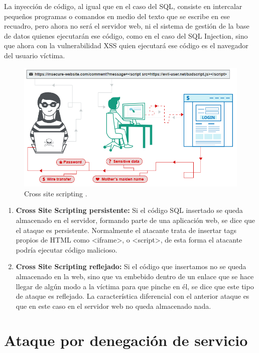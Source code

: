 La inyección de código, al igual que en el caso del SQL, consiste en intercalar pequeños programas o comandos en medio del texto que se escribe en ese recuadro, 
pero ahora no será el servidor web, ni el sistema de gestión de la base de datos quienes ejecutarán ese código, como en el caso del SQL Injection, sino que ahora 
con la vulnerabilidad XSS quien ejecutará ese código es el navegador del usuario víctima.

\begin{figure}[tphb]
  		   \centering
     		   \includegraphics[width=5in]{xss.png}
  		   \caption{Cross site scripting \cite{xss}.}
  		   \label{img:xss}
\end{figure}

\begin{enumerate}
\item {\bfseries Cross Site Scripting persistente:}
Si el código SQL insertado se queda almacenado en el servidor, formando parte de una aplicación web, se dice que el ataque es persistente. Normalmente el atacante
trata de insertar tags propios de HTML como <iframe>, o <script>, de esta forma el atacante podría ejecutar código malicioso.

\item {\bfseries Cross Site Scripting reflejado:}
Si el código que insertamos no se queda almacenado en la web, sino que va embebido dentro de un enlace que se hace llegar de algún modo a la víctima para que 
pinche en él, se dice que este tipo de ataque es reflejado. La característica diferencial con el anterior ataque es que en este caso en el servidor web no queda almacenado nada.

\end{enumerate}

\section{Ataque por denegación de servicio}
\label{sec:denegacion-servicio}

